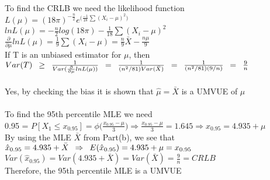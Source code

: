 \\

To find the CRLB we need the likelihood function\\

$L(\mu) = (18\pi)^{-\frac{n}{2}} e^{\Big(\frac{-1}{18} \sum{(X_i - \mu)^2}\Big)}$\\

$lnL(\mu) = -\frac{n}{2}log(18\pi) - \frac{1}{18}\sum{(X_i - \mu)^2}$\\

$\frac{\partial}{\partial \mu} ln L(\mu) = \frac{1}{9} \sum{(X_i - \mu)} = \frac{n}{9}\bar{X} - \frac{n\mu}{9}$\\

If T is an unbiased estimator for $\mu$, then\\

$Var(T) \enskip \ge \enskip \frac{1}{Var(\frac{\partial}{\partial \mu} ln L(\mu))} \enskip = \enskip \frac{1}{({n^2}/81)Var(\bar{X})} \enskip = \enskip \frac{1}{({n^2}/81)(9/n)} \enskip = \enskip \frac{9}{n}$\\

\\

Yes, by checking the bias it is shown that $\hat{\mu} = \bar{X}$ is a UMVUE of $\mu$\\

\\

To find the 95th percentile MLE we need\\

0.95 = $P[X_1 \le x_{0.95}] = \phi{\Big( \frac{x_{0.95} - \mu}{3}}\Big) \Rightarrow \frac{x_{0.95} - \mu}{3} = 1.645 \Rightarrow x_{0.95}  = 4.935+\mu $\\

By using the MLE $\bar{X}$ from Part(b), we see that\\

$\hat{x}_{0.95} = 4.935 + \bar{X} \enskip \Rightarrow \enskip E(\hat{x}_{0.95}) = 4.935 + \mu = x_{0.95}$\\

$Var(\hat{x}_{0.95}) = Var(4.935 + \bar{X}) = Var(\bar{X}) = \frac{9}{n} = CRLB$\\

Therefore, the 95th percentile MLE is a UMVUE\\